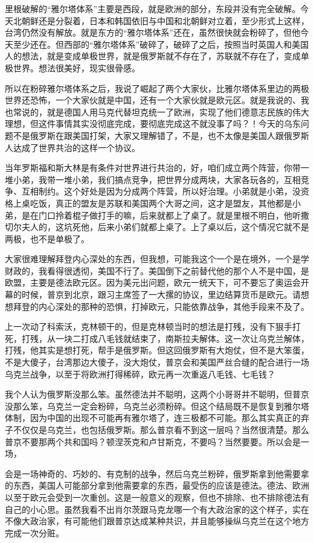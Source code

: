 \documentclass[UTF8, 12pt, a4paper]{ctexrep}
\begin{document}
里根破解的“雅尔塔体系”主要是西段，就是欧洲的部分，东段并没有完全破解。今天北朝鲜还是分裂着，日本和韩国依旧与中国和北朝鲜对立着，至少形式上这样，台湾仍然没有解放。就是东方的“雅尔塔体系”还在，虽然很快就会粉碎了，但他今天至少还在。但西部的“雅尔塔体系”破碎了，破碎了之后，按照当时英国人和美国人的想法，就是变成单极世界，就是俄罗斯就不存在了，苏联就不存在了，变成单极世界。想法很美好，现实很骨感。

所以在粉碎雅尔塔体系之后，我说了崛起了两个大家伙，比雅尔塔体系里边的两极世界还恐怖，一个大家伙就是中国，还有一个大家伙就是欧元区。就是我说的、我也常说的，就是德国人用马克代替坦克统一了欧洲，实现了他们德意志民族的伟大理想，但这件事情其实没彻底完成，要彻底完成这不就没事了吗？！今天的乌东问题不是俄罗斯在跟美国打架，大家又理解错了，不是，也不太像是美国人跟俄罗斯人达成了世界共治的这样一个协议。

当年罗斯福和斯大林是有条件对世界进行共治的，好，咱们成立两个阵营，你带一堆小弟，我带一堆小弟，我们搞点竞争，把世界分成两块，大家各玩各的，互相竞争、互相制约。这个好处是因为分成两个阵营，所以好治理。小弟就是小弟，没资格上桌吃饭，真正的盟友是苏联和美国两个大哥之间，这才是盟友，其他都是小弟，是在门口拎着棍子做打手的嘛，后来就都上了桌了。就是里根不明白，他听撒切尔夫人的，这坑死他，后来小弟们就都上桌了。上了桌以后，这个情况它就不是两极，也不是单极了。

大家很难理解拜登内心深处的东西，但我想，可能我这个一个是在境外，一个是学财政的，我看得很透彻，美国不行了。美国倒下之前替代他的那个人不是中国，是欧盟，主要是德法欧元区。因为美元出问题，欧元一统天下，可不要忘了奥运会开幕的时候，普京到北京，跟习主席签了一大摞的协议，里边结算货币是欧元。请想想拜登的内心深处的那种的恐惧，打掉欧元，只能依靠战争，其他手段来不及了。

上一次动了科索沃，克林顿干的，但是克林顿当时的想法是打残，没有下狠手打死，打残，从一块二打成八毛钱就结束了，南斯拉夫解体。这一次让乌克兰解体，打残，他其实是想打死，帮手是俄罗斯。但这回俄罗斯有大炮仗，但不是大笨蛋，不是大傻子，台湾那边大傻子，没大炮仗，普京会和美国严丝合缝的配合进行一场乌克兰战争，以至于将欧洲打得稀碎，欧元再一次重返八毛钱、七毛钱？

我个人认为俄罗斯没那么笨。虽然德法并不聪明，这两个小哥哥并不聪明，但普京没那么笨，乌克兰一定会粉碎，乌克兰必须粉碎。但这个结局既不是恢复到雅尔塔体制，因为中国的出现不可能再有雅尔塔了，连三极都不可能。那么其实真正的弃子不仅仅是乌克兰，也包括俄罗斯。那么普京看不到这一层吗？当然很清楚。那么普京不要那两个共和国吗？顿涅茨克和卢甘斯克，不要吗？当然要要。所以会是一场，

会是一场神奇的、巧妙的、有克制的战争，然后乌克兰粉碎，俄罗斯拿到他需要拿的东西，美国人可能部分拿到他需要拿的东西，最受伤的应该是德法。德法、欧洲以至于欧元会受到一次重创。这是一般意义的观察，但也不排除、也不排除德法有自己的小心思。虽然我看不出肖尔茨跟马克龙哪一个有大政治家的这个样子，实在不像大政治家，有可能他们跟普京达成某种共识，并且能够操纵乌克兰在这个地方完成一次分赃。
\end{document}
